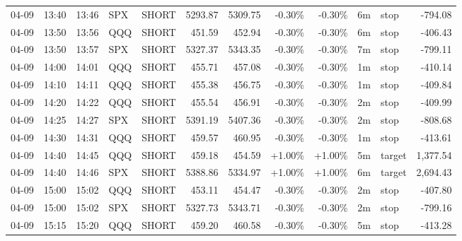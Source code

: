 \documentclass[11pt,a4paper,twoside]{article}
\begin{document}
\begin{center}
\begin{longtable}{>{\color{txtmain}}l l l l l r r r r r >{\color{txtmain}}l r}
04-09 & 13:40 & 13:46 & SPX & SHORT & 5293.87 & 5309.75 & \textcolor{lossred}{-0.30\%} & \textcolor{lossred}{-0.30\%} & 6m & stop & \textcolor{lossred}{-794.08} \\
04-09 & 13:50 & 13:56 & QQQ & SHORT & 451.59 & 452.94 & \textcolor{lossred}{-0.30\%} & \textcolor{lossred}{-0.30\%} & 6m & stop & \textcolor{lossred}{-406.43} \\
04-09 & 13:50 & 13:57 & SPX & SHORT & 5327.37 & 5343.35 & \textcolor{lossred}{-0.30\%} & \textcolor{lossred}{-0.30\%} & 7m & stop & \textcolor{lossred}{-799.11} \\
04-09 & 14:00 & 14:01 & QQQ & SHORT & 455.71 & 457.08 & \textcolor{lossred}{-0.30\%} & \textcolor{lossred}{-0.30\%} & 1m & stop & \textcolor{lossred}{-410.14} \\
04-09 & 14:10 & 14:11 & QQQ & SHORT & 455.38 & 456.75 & \textcolor{lossred}{-0.30\%} & \textcolor{lossred}{-0.30\%} & 1m & stop & \textcolor{lossred}{-409.84} \\
04-09 & 14:20 & 14:22 & QQQ & SHORT & 455.54 & 456.91 & \textcolor{lossred}{-0.30\%} & \textcolor{lossred}{-0.30\%} & 2m & stop & \textcolor{lossred}{-409.99} \\
04-09 & 14:25 & 14:27 & SPX & SHORT & 5391.19 & 5407.36 & \textcolor{lossred}{-0.30\%} & \textcolor{lossred}{-0.30\%} & 2m & stop & \textcolor{lossred}{-808.68} \\
04-09 & 14:30 & 14:31 & QQQ & SHORT & 459.57 & 460.95 & \textcolor{lossred}{-0.30\%} & \textcolor{lossred}{-0.30\%} & 1m & stop & \textcolor{lossred}{-413.61} \\
04-09 & 14:40 & 14:45 & QQQ & SHORT & 459.18 & 454.59 & \textcolor{wingreen}{+1.00\%} & \textcolor{wingreen}{+1.00\%} & 5m & target & \textcolor{wingreen}{1,377.54} \\
04-09 & 14:40 & 14:46 & SPX & SHORT & 5388.86 & 5334.97 & \textcolor{wingreen}{+1.00\%} & \textcolor{wingreen}{+1.00\%} & 6m & target & \textcolor{wingreen}{2,694.43} \\
04-09 & 15:00 & 15:02 & QQQ & SHORT & 453.11 & 454.47 & \textcolor{lossred}{-0.30\%} & \textcolor{lossred}{-0.30\%} & 2m & stop & \textcolor{lossred}{-407.80} \\
04-09 & 15:00 & 15:02 & SPX & SHORT & 5327.73 & 5343.71 & \textcolor{lossred}{-0.30\%} & \textcolor{lossred}{-0.30\%} & 2m & stop & \textcolor{lossred}{-799.16} \\
04-09 & 15:15 & 15:20 & QQQ & SHORT & 459.20 & 460.58 & \textcolor{lossred}{-0.30\%} & \textcolor{lossred}{-0.30\%} & 5m & stop & \textcolor{lossred}{-413.28} \\

\end{longtable}
\end{center}
\end{document}

